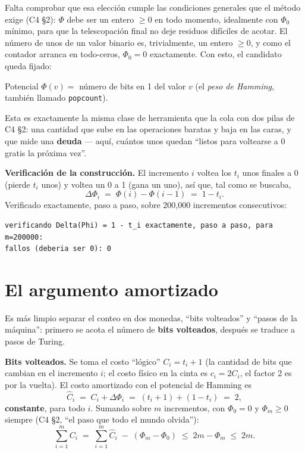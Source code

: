 \documentclass[11pt]{article}
\begin{document}
Falta comprobar que esa elección cumple las condiciones generales que el método exige (C4 §2): $\Phi$ debe
ser un entero $\ge 0$ en todo momento, idealmente con $\Phi_0$ mínimo, para que la telescopación final no
deje residuos difíciles de acotar. El número de unos de un valor binario es, trivialmente, un entero $\ge
0$, y como el contador arranca en todo-ceros, $\Phi_0=0$ exactamente. Con esto, el candidato queda fijado:

\begin{resultado}{Potencial}
$\Phi(v) = $ número de bits en 1 del valor $v$ (el \emph{peso de Hamming}, también llamado
\texttt{popcount}).
\end{resultado}

Esta es exactamente la misma clase de herramienta que la cola con dos pilas de C4 §2: una cantidad que sube
en las operaciones baratas y baja en las caras, y que mide una \textbf{deuda} --- aquí, cuántos unos quedan
``listos para voltearse a 0 gratis la próxima vez''.

\textbf{Verificación de la construcción.} El incremento $i$ voltea los $t_i$ unos finales a 0 (pierde $t_i$
unos) y voltea un 0 a 1 (gana un uno), así que, tal como se buscaba,
\[ \Delta\Phi_i \;=\; \Phi(i)-\Phi(i-1) \;=\; 1-t_i. \]
Verificado exactamente, paso a paso, sobre 200,000 incrementos consecutivos:
\begin{lstlisting}[style=salida]
verificando Delta(Phi) = 1 - t_i exactamente, paso a paso, para m=200000:
fallos (deberia ser 0): 0
\end{lstlisting}

\section{El argumento amortizado}

Es más limpio separar el conteo en dos monedas, ``bits volteados'' y ``pasos de la máquina'': primero se acota el número de \textbf{bits volteados}, después se traduce a pasos de
Turing.

\textbf{Bits volteados.} Se toma el costo ``lógico'' $C_i = t_i+1$ (la cantidad de bits que cambian en el
incremento $i$; el costo físico en la cinta es $c_i=2C_i$, el factor 2 es por la vuelta). El costo
amortizado con el potencial de Hamming es
\[
\hat C_i \;=\; C_i + \Delta\Phi_i \;=\; (t_i+1) + (1-t_i) \;=\; 2,
\]
\textbf{constante}, para todo $i$. Sumando sobre $m$ incrementos, con $\Phi_0=0$ y $\Phi_m\ge 0$ siempre
(C4 §2, ``el paso que todo el mundo olvida''):
\[
\sum_{i=1}^m C_i \;=\; \sum_{i=1}^m \hat C_i \;-\;(\Phi_m-\Phi_0) \;\le\; 2m - \Phi_m \;\le\; 2m.
\]
\end{document}
